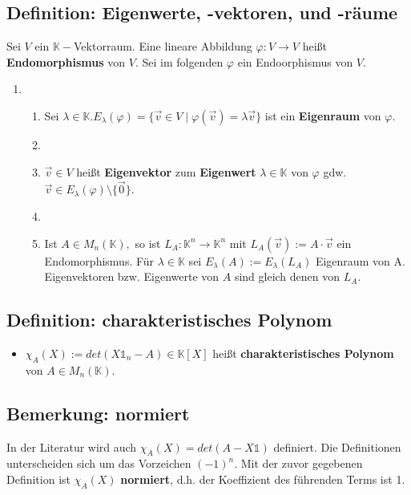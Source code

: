 \documentclass[titlepage]{article}
\newcommand{\K}{\mathbb{K}}
\newcommand{\1}{\mathbb{1}}
\newcommand{\0}{\mathbb{0}}
\newcommand\Umbruch[2][13.5cm]{\begin{varwidth}{#1}\centering#2\end{varwidth}}
\begin{document}
			\subsection{Definition: Eigenwerte, -vektoren, und -räume}
				Sei $V$ ein $\K-$Vektorraum. Eine lineare Abbildung $\varphi:V\rightarrow V$ heißt \textbf{Endomorphismus} von $V$. Sei im folgenden $\varphi$ ein Endoorphismus von $V$.
				\begin{enumerate}
					\item []
					\begin{enumerate}
						\item Sei $\lambda\in\K.E_{\lambda}(\varphi)=\{\vec{v}\in V\mid\varphi(\vec{v})=\lambda\vec{v}\}$ ist ein \textbf{Eigenraum} von $\varphi$.
						\item []
						\item $\vec{v}\in V$ heißt \textbf{Eigenvektor} zum \textbf{Eigenwert} $\lambda\in\K$ von $\varphi$ gdw. $\vec{v}\in E_{\lambda}(\varphi)\setminus\{\vec{0}\}$.
						\item []
						\item Ist $A\in M_n(\K),$ so ist $L_{A}:\K^n\rightarrow\K^n$ mit $L_A(\vec{v}):=A\cdot\vec{v}$ ein Endomorphismus. Für $\lambda\in\K$ sei $E_{\lambda}(A):=E_{\lambda}(L_A)$ Eigenraum von A. Eigenvektoren bzw. Eigenwerte von $A$ sind gleich denen von $L_A$.
					\end{enumerate}
				\end{enumerate}
				\begin{center}
				\end{center}
			\subsection{Definition: charakteristisches Polynom}
				\begin{itemize}
					\item $\chi_A(X):=det(X\1_n-A)\in\K[X]$ heißt \textbf{charakteristisches Polynom} von $A\in M_n(\K)$.
				\end{itemize}
			\subsection{Bemerkung: normiert}
				In der Literatur wird auch $\chi_A(X)=det(A-X\1)$ definiert. Die Definitionen unterscheiden sich um das Vorzeichen $(-1)^n$. Mit der zuvor gegebenen Definition ist $\chi_A(X)$ \textbf{normiert}, d.h. der Koeffizient des führenden Terms ist 1.
\end{document}
